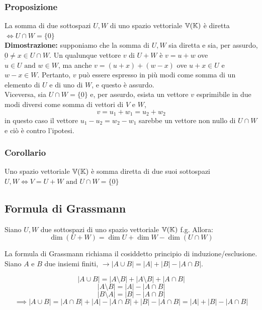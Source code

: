 \documentclass[../main.tex]{subfiles}
\begin{document}
\subsubsection{Proposizione}
La somma di due sottospazi $U, W$ di uno spazio vettoriale $\mathbb{V} (\mathbb{K})$ è diretta
$\iff{U} \cap{W} = \{0\}$ \\ \textbf{Dimostrazione:} supponiamo che la somma di
$U,W$ sia diretta e sia, per assurdo, $\underbar{0} \ne{} x\in{U}\cap{} W$. Un
qualunque vettore $v$ di $U+W$ è $v=u+w$ ove $u\in{U}\text{ and } w\in{W}$, ma
anche $v= (u+x)+ (w-x)$ ove $u+x\in{U}$ e $w-x\in{W}$. Pertanto, $v$ può essere
espresso in più modi come somma di un elemento di $U$ e di uno di $W$, e questo
è assurdo.\\ Viceversa, sia $U\cap{W} = \{\underbar{0}\}$ e, per assurdo,
esista un vettore $v$ esprimibile in due modi diversi come somma di vettori di
$V$ e $W$,
\[
    v=u_1+w_1=u_2+w_2
\]
in questo caso il vettore $u_1-u_2=w_2-w_1$ sarebbe un vettore non nullo di
$U\cap{W}$ e ciò è contro l'ipotesi.

\subsubsection{Corollario}
Uno spazio vettoriale $\mathbb{V} (\mathbb{K})$ è somma diretta di due suoi sottospazi $U, W \iff{V}
    = U+W \text{ and } U \cap{W} = \{\underbar{0}\}$

\subsection{Formula di Grassmann}
Siano $U, W$ due sottospazi di uno spazio vettoriale $\mathbb{V} (\mathbb{K})$ f.g. Allora:
\[
    \dim(U+W) = \dim U + \dim W - \dim(U\cap W)
\]

La formula di Grassmann richiama il cosiddetto principio di
induzione/esclusione. Siano $A$ e $B$ due insiemi finiti, $\rightarrow |A \cup
    B| = |A| + |B| - |A\cap B|$.

\begin{minipage}{0.2\textwidth}
\end{minipage}%
\begin{minipage}{0.4\textwidth}
    \[
        |A\cup B| = |A\setminus B| + |A\setminus B| + |A\cap B|\]
    \[
        |A\setminus B| = |A| - |A\cap B|
    \]
    \[
        |B\setminus A| = |B| - |A\cap B|
    \]
    \[
        \implies |A\cup B| = |A\cap B| + |A| - |A\cap B| + |B| - |A\cap B| = |A| + |B| - |A\cap B|
    \]
    \vspace{2pt}
\end{minipage}
\end{document}
